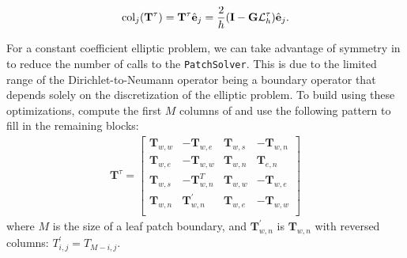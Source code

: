 \begin{align}
\text{col}_j (\mathbf T^{\tau}) = \mathbf T^{\tau} \hat{\textbf{e}}_j = \frac{2}{h} (\textbf{I} - \textbf{G} \mathcal{L}_h^{\tau}) \hat{\textbf{e}}_j.
\end{align}

For a constant coefficient elliptic problem, we can take advantage of symmetry in \Ttau to reduce the number of calls to the \texttt{PatchSolver}. This is due to the limited range of the Dirichlet-to-Neumann operator being a boundary operator that depends solely on the discretization of the elliptic problem. To build \Ttau using these optimizations, compute the first $M$ columns of \Ttau and use the following pattern to fill in the remaining blocks:
\begin{align}
\textbf{T}^{\tau} =
\begin{bmatrix}
    \textbf{T}_{w,w} & -\textbf{T}_{w,e} & \textbf{T}_{w,s} & -\textbf{T}_{w,n} \\
    \textbf{T}_{w,e} & -\textbf{T}_{w,w} & \textbf{T}_{w,n} & \textbf{T}_{e,n} \\
    \textbf{T}_{w,s} & -\textbf{T}_{w,n}^T & \textbf{T}_{w,w} & -\textbf{T}_{w,e} \\
    \textbf{T}_{w,n} & \textbf{T}_{w,n}^{'} & \textbf{T}_{w,e} & -\textbf{T}_{w,w} \\
\end{bmatrix}
\end{align}
where $M$ is the size of a leaf patch boundary, and $\textbf{T}_{w,n}^{'}$ is $\textbf{T}_{w,n}$ with reversed columns: $T_{i,j}^{'} = T_{M-i,j}$.



